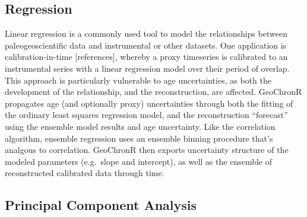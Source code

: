 \documentclass[gchron, manuscript]{copernicus}
\begin{document}
\subsection{Regression}

Linear regression is a commonly used tool to model the relationships between paleogeoscientific data and instrumental or other datasets.
One application is calibration-in-time {[}references{]}, whereby a proxy timeseries is calibrated to an instrumental series with a linear regression model over their period of overlap.
This approach is particularly vulnerable to age uncertainties, as both the development of the relationship, and the reconstruction, are affected.
GeoChronR propagates age (and optionally proxy) uncertainties through both the fitting of the ordinary least squares regression model, and the reconstruction ``forecast'' using the ensemble model results and age uncertainty.
Like the correlation algorithm, ensemble regression uses an ensemble binning procedure that's analgous to correlation.
GeoChronR then exports uncertainty structure of the modeled parameters (e.g.~slope and intercept), as well as the ensemble of reconstructed calibrated data through time.

\subsection{Principal Component Analysis}
\end{document}
